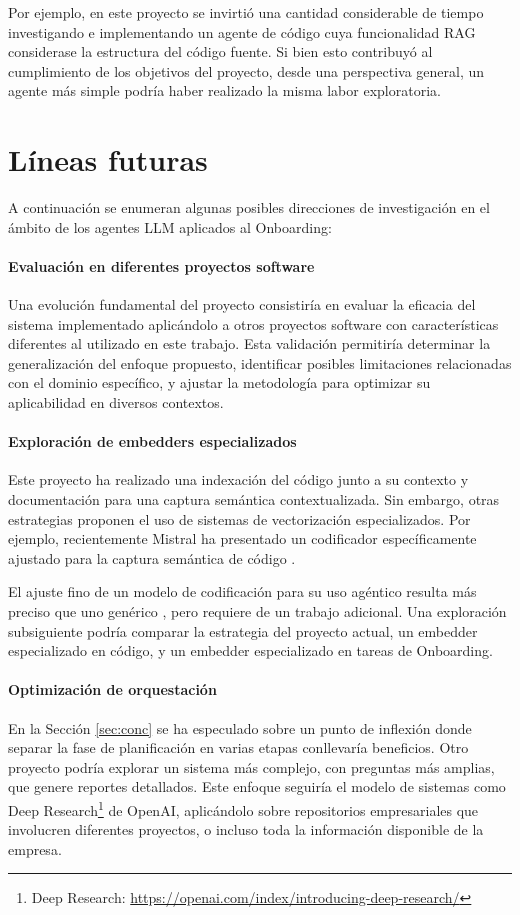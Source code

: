 Por ejemplo, en este proyecto se invirtió una cantidad considerable de tiempo investigando e implementando un agente de código cuya funcionalidad RAG considerase la estructura del código fuente. Si bien esto contribuyó al cumplimiento de los objetivos del proyecto, desde una perspectiva general, un agente más simple podría haber realizado la misma labor exploratoria.

\section{Líneas futuras}
A continuación se enumeran algunas posibles direcciones de investigación en el ámbito de los agentes LLM aplicados al Onboarding:

\paragraph{Evaluación en diferentes proyectos software} Una evolución fundamental del proyecto consistiría en evaluar la eficacia del sistema implementado aplicándolo a otros proyectos software con características diferentes al utilizado en este trabajo. Esta validación permitiría determinar la generalización del enfoque propuesto, identificar posibles limitaciones relacionadas con el dominio específico, y ajustar la metodología para optimizar su aplicabilidad en diversos contextos.

\paragraph{Exploración de embedders especializados} Este proyecto ha realizado una indexación del código junto a su contexto y documentación para una captura semántica contextualizada. Sin embargo, otras estrategias proponen el uso de sistemas de vectorización especializados. Por ejemplo, recientemente Mistral ha presentado un codificador específicamente ajustado para la captura semántica de código \cite{noauthor_codestral_nodate}.

El ajuste fino de un modelo de codificación para su uso agéntico resulta más preciso que uno genérico \cite{khattab_relevance-guided_2021,xiong_approximate_2020,yu_augmentation-adapted_2023}, pero requiere de un trabajo adicional. Una exploración subsiguiente podría comparar la estrategia del proyecto actual, un embedder especializado en código, y un embedder especializado en tareas de Onboarding.

\paragraph{Optimización de orquestación} En la Sección \ref{sec:conc} se ha especulado sobre un punto de inflexión donde separar la fase de planificación en varias etapas conllevaría beneficios. Otro proyecto podría explorar un sistema más complejo, con preguntas más amplias, que genere reportes detallados. Este enfoque seguiría el modelo de sistemas como Deep Research\footnote{Deep Research: \url{https://openai.com/index/introducing-deep-research/}} de OpenAI, aplicándolo sobre repositorios empresariales que involucren diferentes proyectos, o incluso toda la información disponible de la empresa.

